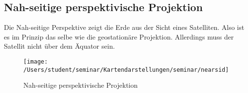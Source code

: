 \subsection{Nah-seitige perspektivische Projektion}
\label{sec:nearsideperspective}
Die Nah-seitige Perspektive zeigt die Erde aus der Sicht eines Satelliten. Also ist es im Prinzip das selbe
wie die geostationäre Projektion. Allerdings muss der Satellit nicht über dem Äquator sein.\\

\begin{figure}[hbtp]
\centering
\texttt{[image: /Users/student/seminar/Kartendarstellungen/seminar/nearsid]} \caption{Nah-seitige perspektivische Projektion}
\end{figure}
\newpage 